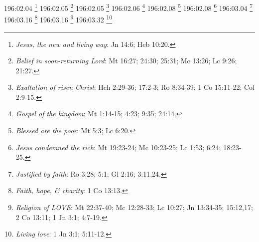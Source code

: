 196:02.04 \footnote{\textit{Jesus, the new and living way}: Jn 14:6; Heb 10:20.}
196:02.05 \footnote{\textit{Belief in soon-returning Lord}: Mt 16:27; 24:30; 25:31; Mc 13:26; Lc 9:26; 21:27.}
196:02.05 \footnote{\textit{Exaltation of risen Christ}: Hch 2:29-36; 17:2-3; Ro 8:34-39; 1 Co 15:11-22; Col 2:9-15.}
196:02.06 \footnote{\textit{Gospel of the kingdom}: Mt 1:14-15; 4:23; 9:35; 24:14.}
196:02.08 \footnote{\textit{Blessed are the poor}: Mt 5:3; Lc 6:20.}
196:02.08 \footnote{\textit{Jesus condemned the rich}: Mt 19:23-24; Mc 10:23-25; Lc 1:53; 6:24; 18:23-25.}
196:03.04 \footnote{\textit{Justified by faith}: Ro 3:28; 5:1; Gl 2:16; 3:11,24.}
196:03.16 \footnote{\textit{Faith, hope, & charity}: 1 Co 13:13.}
196:03.16 \footnote{\textit{Religion of LOVE}: Mt 22:37-40; Mc 12:28-33; Lc 10:27; Jn 13:34-35; 15:12,17; 2 Co 13:11; 1 Jn 3:1; 4:7-19.}
196:03.32 \footnote{\textit{Living love}: 1 Jn 3:1; 5:11-12.}
